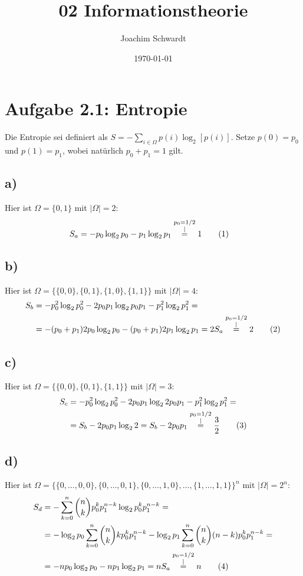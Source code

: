 \documentclass[a4paper,12pt]{article}
\newcommand\numberthis{\addtocounter{equation}{1}\tag{\theequation}}
\newcommand{\kom}{}
\begin{document}
\title{02 Informationstheorie}
\author{Joachim Schwardt}
\date{\today}
\maketitle

\section*{Aufgabe 2.1: Entropie}
Die Entropie sei definiert als $S=-\sum_{i\in\Omega}p(i)\log_2[p(i)]$. Setze $p(0)=p_0$ und $p(1)=p_1$, wobei natürlich $p_0+p_1=1$ gilt. 
\subsection*{a)}Hier ist $\Omega=\{0,1\}$ mit $|\Omega|=2$:
\begin{align*}
S_a&=-p_0\log_2p_0-p_1\log_2p_1\kom\overset{\substack{{p_0=1/2} \\ |}}{=}1\numberthis\label{S aus a}
\end{align*}
\subsection*{b)}Hier ist $\Omega=\{\{0,0\},\{0,1\},\{1,0\},\{1,1\}\}$ mit $|\Omega|=4$:
\begin{align*}
S_b&=-p_0^2\log_2p_0^2-2p_0p_1\log_2p_0p_1-p_1^2\log_2p_1^2=\\
&=-(p_0+p_1)2p_0\log_2p_0-(p_0+p_1)2p_1\log_2p_1=2S_a\kom\overset{\substack{{p_0=1/2} \\ |}}{=}2\numberthis\label{S aus b}
\end{align*}
\subsection*{c)}Hier ist $\Omega=\{\{0,0\},\{0,1\},\{1,1\}\}$ mit $|\Omega|=3$:
\begin{align*}
S_c&=-p_0^2\log_2p_0^2-2p_0p_1\log_22p_0p_1-p_1^2\log_2p_1^2=\\
&=S_b-2p_0p_1\log_22=S_b-2p_0p_1\kom\overset{\substack{{p_0=1/2} \\ |}}{=}\frac{3}{2}\numberthis\label{S aus c}
\end{align*}
\subsection*{d)}Hier ist $\Omega=\{\{0,\dots,0,0\},\{0,\dots,0,1\},\{0,\dots,1,0\},\dots,\{1,\dots,1,1\}\}^n$ mit $|\Omega|=2^n$:
\begin{align*}
S_d&=-\sum_{k=0}^n\binom{n}{k}p_0^kp_1^{n-k}\log_2p_0^kp_1^{n-k}=\\
&=-\log_2p_0\sum_{k=0}^n\binom{n}{k}kp_0^kp_1^{n-k}-\log_2p_1\sum_{k=0}^n\binom{n}{k}(n-k)p_0^kp_1^{n-k}=\\
&=-np_0\log_2p_0-np_1\log_2p_1=nS_a\kom\overset{\substack{{p_0=1/2} \\ |}}{=}n\numberthis\label{S aus d}
\end{align*}
\end{document}
